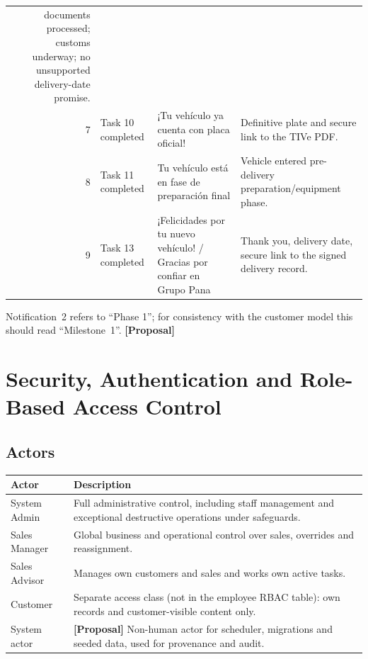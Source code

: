 \documentclass[11pt,a4paper]{article}
\newcommand{\tagprop}{\textcolor{orange!80!black}{\textbf{[Proposal]}}}
\begin{document}
\begin{longtable}{@{}rL{3.6cm}L{4.6cm}L{4.4cm}@{}}
	documents processed; customs
	underway; no unsupported delivery-date promise.
	\\
	7                                                             & Task 10
	completed                                                     & ¡Tu vehículo
	ya cuenta con placa
	oficial!                                                      & Definitive
	plate and secure link to the TIVe PDF.
	\\
	8                                                             & Task 11
	completed                                                     & Tu vehículo
	está
	en fase de preparación final                                  & Vehicle
	entered
	pre-delivery preparation/equipment phase.
	\\
	9                                                             & Task 13
	completed                                                     & ¡Felicidades
	por tu nuevo vehículo! / Gracias por confiar en Grupo
	Pana                                                          & Thank you,
	delivery date, secure link to the signed delivery record.
	\\
	\bottomrule
\end{longtable}

Notification~2 refers to ``Phase 1''; for consistency with the customer model
this should read ``Milestone~1''. \tagprop{}

\section{Security, Authentication and Role-Based Access Control}\label{sec:auth}

\subsection{Actors}

\begin{longtable}{@{}L{3.4cm}L{12.4cm}@{}}
	\toprule
	\textbf{Actor} & \textbf{Description}
	\\
	\midrule
	\endhead
	System Admin   & Full administrative control, including staff management and
	exceptional destructive operations under safeguards.
	\\
	Sales Manager  & Global business and operational control over sales, overrides
	and reassignment.
	\\
	Sales Advisor  & Manages own customers and sales and works own active tasks.
	\\
	Customer       & Separate access class (not in the employee RBAC table): own
	records
	and customer-visible content only.
	\\
	System actor   & \tagprop{} Non-human actor for scheduler, migrations and
	seeded data, used for provenance and audit.
	\\
	\bottomrule
\end{longtable}
\end{document}
